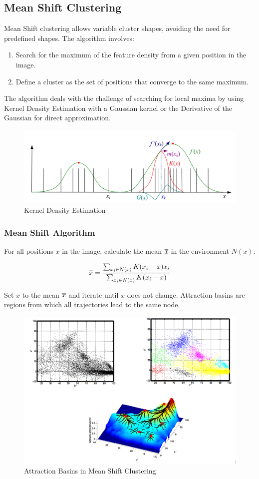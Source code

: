 \subsection{Mean Shift Clustering}

Mean Shift clustering allows variable cluster shapes, avoiding the need for predefined shapes. The algorithm involves:
\begin{enumerate}
	\item Search for the maximum of the feature density from a given position in the image.
	\item Define a cluster as the set of positions that converge to the same maximum.
\end{enumerate}
The algorithm deals with the challenge of searching for local maxima by using Kernel Density Estimation with a Gaussian kernel
or the Derivative of the Gaussian for direct approximation.

\begin{figure}[h]
	\centering
	\includegraphics[width=0.7\linewidth]{img/kernel_density_estimation}
	\caption{Kernel Density Estimation}
\end{figure}

\subsubsection{Mean Shift Algorithm}

For all positions $x$ in the image, calculate the mean $\overline{x}$ in the environment $N(x)$:

\[
\overline{x} = \frac{\sum_{x_i \in N(x)} K(x_i - x) x_i}{\sum_{x_i \in N(x)} K(x_i - x)}
\]

Set $x$ to the mean $\overline{x}$ and iterate until $x$ does not change.
Attraction basins are regions from which all trajectories lead to the same node.

\begin{figure}[h]
	\centering
	\includegraphics[width=0.7\linewidth]{img/attraction_basins}
	\caption{Attraction Basins in Mean Shift Clustering}
\end{figure}

